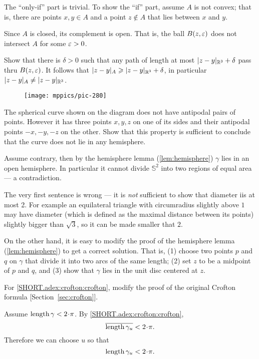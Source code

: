 The ``only-if'' part is trivial.
To show the ``if'' part, assume $A$ is not convex;
that is, there are points $x,y\in A$ and a point $z\notin A$ that lies between $x$ and $y$.

Since $A$ is closed, its complement is open.
That is, the ball $B(z,\varepsilon)$ does not intersect $A$ for some $\varepsilon>0$.

Show that there is $\delta>0$ such that any path of length at most $|z-y|_{\mathbb{R}^3}+\delta$ pass thru $B(z,\varepsilon)$.
It follows that $|z-y|_A\geqslant |z-y|_{\mathbb{R}^3}+\delta$, 
in particular$|z-y|_A\ne |z-y|_{\mathbb{R}^3}$.

\begin{wrapfigure}{r}{30 mm}
\vskip-0mm
\centering
\texttt{[image: mppics/pic-280]}
\vskip0mm
\end{wrapfigure}

The spherical curve shown on the diagram does not have antipodal pairs of points.
However it has three points $x,y,z$ on one of its sides and their antipodal points $-x,-y,-z$ on the other.
Show that this property is sufficient to conclude that the curve does not lie in any hemisphere.

Assume contrary, then by the hemisphere lemma (\ref{lem:hemisphere}) $\gamma$ lies in an open hemisphere.
In particular it cannot divide $\mathbb{S}^2$ into two regions of equal area --- a contradiction.

The very first sentence is wrong --- it is {}\emph{not} sufficient to show that diameter iis at most 2.
For example an equilateral triangle with circumradius slightly above $1$ may have diameter (which is defined as the maximal distance between its points) slightly bigger than $\sqrt3$, so it can be made smaller that $2$.

On the other hand, it is easy to modify the proof of the hemisphere lemma (\ref{lem:hemisphere}) to get a correct solution.
That is, (1) choose two points $p$ and $q$ on $\gamma$ that divide it into two arcs of the same length;
(2) set $z$ to be a midpoint of $p$ and $q$,
and (3) show that $\gamma$ lies in the unit disc centered at $z$.


For \ref{SHORT.adex:crofton:crofton}, modify the proof of the original Crofton formula
[Section~\ref{sec:crofton}].

Assume $\length \gamma<2\cdot\pi$.
By \ref{SHORT.adex:crofton:crofton},
\[\overline{\length \gamma_u}<2\cdot\pi.\]
Therefore we can choose $u$ so that 
\[\length \gamma_u<2\cdot\pi.\]

